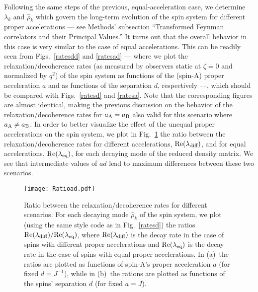 \documentclass[]{nature}
\makeatletter
\renewenvironment{figure*}
               {\@dblfloat{figure}}
               {\end@dblfloat}
\makeatother
\begin{document}
{Following the same steps of the previous, equal-acceleration case, we determine
$\lambda_k$ and $\hat\rho_k$ which govern the long-term evolution of the spin system for different proper accelerations
--- see Methods' subsection ``Transformed Feynman correlators and their Principal Values.''
It turns out that the overall behavior
in this case  is very similar to the case of equal 
accelerations.
This can be readily seen from Figs.~\ref{ratesdd} and \ref{ratesad} --- where we plot the relaxation/decoherence 
rates (as measured by observers
static at $\zeta = 0$ and normalized by $q^2$) of the spin system as functions
of the (spin-A) proper acceleration $a$ and as functions of the separation $d$, respectively ---, 
which should be compared with Figs.~\ref{ratesd} and \ref{ratesa}. Note that the corresponding figures are almost identical, making  the previous discussion  on the behavior of the relaxation/decoherence rates
for $a_{\rm A}=a_{\rm B}$
also  valid for this scenario  where $a_{\rm A}\neq a_{\rm B}$. In order to better visualize the effect
of the unequal proper accelerations on the spin system, we plot in Fig.~\ref{FigDiff}
the  ratio between the relaxation/decoherence rates for different accelerations,
${\rm Re}(\lambda_\text{\rm diff})$, and for equal accelerations, ${\rm Re}(\lambda_\text{\rm eq})$, for  each decaying mode of the reduced density matrix.
We see that intermediate values of $ad$ lead to maximum differences between these two scenarios.
\begin{figure*}
 \texttt{[image: Ratioad.pdf]}
\caption{Ratio between the relaxation/decoherence rates for different scenarios.
For each decaying mode $\hat\rho_k$ of the spin system, we 
plot (using the same style code
as in Fig.~\ref{ratesd})  the ratios ${\rm Re}(\lambda_\text{\rm diff})/{\rm Re}(\lambda_\text{\rm eq})$, where
${\rm Re}(\lambda_\text{\rm diff})$ is the decay rate in the case of spins with 
different proper accelerations and ${\rm Re}(\lambda_\text{\rm eq})$ is the decay rate in the case of spins with 
equal proper accelerations. In   (a)~the ratios are plotted as functions of spin-A's proper acceleration $a$ 
(for fixed $d = J^{-1}$), while in (b)~the rations are plotted as functions of the spins' separation $d$ (for fixed $a=J$).}
\label{FigDiff}
\end{figure*}

}
\end{document}
